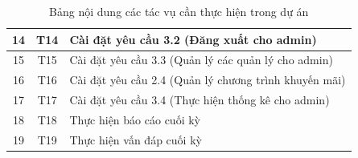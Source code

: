 \documentclass[a4paper, 12pt]{article}
\begin{document}
\begin{table}[H]
\begin{center}
\begin{tabular}{|c|c|l|}
            14  & T14     & Cài đặt yêu cầu 3.2 (Đăng xuất cho admin)                   \\ \hline \rowcolor[HTML]{C9DAF8} 
            15  & T15     & Cài đặt yêu cầu 3.3 (Quản lý các quản lý cho admin)         \\ \hline \rowcolor[HTML]{C9DAF8} 
            16  & T16     & Cài đặt yêu cầu 2.4 (Quản lý chương trình khuyến mãi)       \\ \hline \rowcolor[HTML]{C9DAF8} 
            17  & T17     & Cài đặt yêu cầu 3.4 (Thực hiện thống kê cho admin)          \\ \hline \rowcolor[HTML]{FCE5CD} 
            18  & T18     & Thực hiện báo cáo cuối kỳ                                   \\ \hline \rowcolor[HTML]{D0E0E3} 
            19  & T19     & Thực hiện vấn đáp cuối kỳ                                   \\ \hline
            \end{tabular}
            \caption{Bảng nội dung các tác vụ cần thực hiện trong dự án}
        \end{center}
    \end{table}
\end{document}

